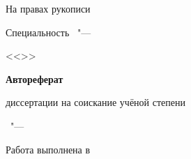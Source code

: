 \thispagestyle{empty}

\vspace{0pt plus1fill} %
\begin{flushright}
  \large{На правах рукописи}
\end{flushright}

\vspace{0pt plus3fill} %
\begin{center}
{\large \thesisAuthor}
\end{center}

\vspace{0pt plus3fill} %
\begin{center}
\textbf {\Large \thesisTitle}

\vspace{0pt plus3fill} %
{\large Специальность \thesisSpecialtyNumber\ "---\par <<\thesisSpecialtyTitle>>}

\vspace{0pt plus1.5fill} %
\textbf{\Large{Автореферат}}\par
\large{диссертации на соискание учёной степени\par \thesisDegree}
\end{center}

\vspace{0pt plus4fill} %
\begin{center}
{\large{\thesisCity\ "--- \thesisYear}}
\end{center}

\newpage
\thispagestyle{empty}
\noindent Работа выполнена в \thesisInOrganization
\vfill

